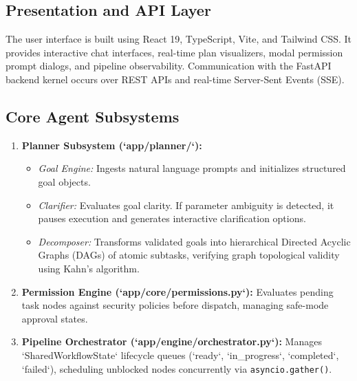 \documentclass[conference]{IEEEtran}
\begin{document}
\subsection{Presentation and API Layer}
The user interface is built using React 19, TypeScript, Vite, and Tailwind CSS. It provides interactive chat interfaces, real-time plan visualizers, modal permission prompt dialogs, and pipeline observability. Communication with the FastAPI backend kernel occurs over REST APIs and real-time Server-Sent Events (SSE).

\subsection{Core Agent Subsystems}
\begin{enumerate}
    \item \textbf{Planner Subsystem (`app/planner/`):}
    \begin{itemize}
        \item \textit{Goal Engine:} Ingests natural language prompts and initializes structured goal objects.
        \item \textit{Clarifier:} Evaluates goal clarity. If parameter ambiguity is detected, it pauses execution and generates interactive clarification options.
        \item \textit{Decomposer:} Transforms validated goals into hierarchical Directed Acyclic Graphs (DAGs) of atomic subtasks, verifying graph topological validity using Kahn's algorithm.
    \end{itemize}

    \item \textbf{Permission Engine (`app/core/permissions.py`):} Evaluates pending task nodes against security policies before dispatch, managing safe-mode approval states.

    \item \textbf{Pipeline Orchestrator (`app/engine/orchestrator.py`):} Manages `SharedWorkflowState` lifecycle queues (`ready`, `in_progress`, `completed`, `failed`), scheduling unblocked nodes concurrently via \texttt{asyncio.gather()}.


\end{enumerate}
\end{document}
